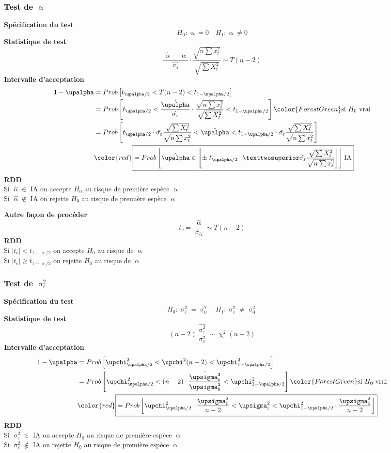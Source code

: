 \documentclass{article}
\newcommand{\halpha}{\hat{\upalpha}}
\newcommand{\sig}{\upsigma_\varepsilon^2}
\newcommand{\studn}{t_{\upalpha / 2}}
\newcommand{\studp}{t_{1 - \upalpha / 2}}
\newcommand{\chin}{\upchi_{\upalpha / 2}^2}
\newcommand{\chip}{\upchi_{1 - \upalpha / 2}^2}
\begin{document}
\subsubsection{Test de $\upalpha$}
	\textbf{Spécification du test} \\
	\[H_0 : \upalpha = 0 \quad H_1 : \upalpha \neq 0\]
	\textbf{Statistique de test}
	\[ \frac{\halpha - \upalpha}{\hat{\sigma_\varepsilon}} \cdot \frac{\sqrt{n \sum x_t^2}}{\sqrt{\sum X_t^2}} \sim T(n-2) \]
	\textbf{Intervalle d'acceptation}
	\begin{align*}
		1- \upalpha &= Prob\left[\studn < T(n-2) <\studp\right] \\
		&= Prob\left[\studn<  \frac{\halpha}{\hat{\sigma_\varepsilon}} \cdot \frac{\sqrt{n \sum x_t^2}}{\sqrt{\sum X_t^2}}<\studp\right] {\color{ForestGreen}\textrm{si }H_0 \textrm{ vrai}}\\
		&= Prob\left[\studn \cdot \hat{\sigma_\varepsilon} \frac{\sqrt{\sum X_t^2}}{\sqrt{n \sum x_t^2}}   < \halpha <\studp \cdot \hat{\sigma_\varepsilon} \frac{\sqrt{\sum X_t^2}}{\sqrt{n \sum x_t^2}} \right]\\
		&{\color{red} \boxed{= Prob\left[\halpha \in \left[\pm \; \studn \cdot² \hat{\sigma_\varepsilon} \frac{\sqrt{\sum X_t^2}}{\sqrt{n \sum x_t^2}}  \right]\right] \textrm{IA} }}
	\end{align*}
	\textbf{RDD } \\
	Si $\halpha \in $ IA on accepte $H_0$ au risque de première espèce $\upalpha$ \\
	Si $\halpha \notin $ IA on rejette $H_0$ au risque de première espèce $\upalpha$ 

	\textbf{Autre façon de procéder} 
\[t_c = \frac{\halpha}{\hat{\sigma}_{\hat{\upalpha}}} \sim T(n-2)\]
	\textbf{RDD}\\
	Si $|t_c| < \studp $ on accepte $H_0$ au risque de $\upalpha$ \\
	Si $|t_c| \geq \studp $ on rejette $H_0$ au risque de $\upalpha$ \\
\subsubsection{Test de $\sig$}
\textbf{Spécification du test} 
\[H_0 : \sig = \upsigma_0^2 \quad H_1 : \sig \neq \upsigma_0^2\]
\textbf{Statistique de test} 
\[(n-2) \frac{\hat{\sig}}{\sig} \sim \upchi^2 (n-2)\]
\textbf{Intervalle d'acceptation}
\begin{align*}
	1 - \upalpha &= Prob\left[\chin<\upchi^2 (n-2)<\chip\right] \\
	&= Prob\left[\chin < (n-2) \cdot \frac{\hat{\sig}}{\upsigma_0^2} < \chip \right] {\color{ForestGreen}\textrm{si }H_0 \textrm{ vrai}}\\
	&{\color{red}\boxed{ = Prob\left[\chin \cdot \frac{\upsigma_ 0^2}{n-2} < \sig < \chip \cdot \frac{\upsigma_ 0^2}{n-2} \right]}}
\end{align*}
\textbf{RDD} \\
	Si $\sig \in $ IA on accepte $H_0$ au risque de première espèce $\upalpha$ \\
	Si $\sig \notin $ IA on rejette $H_0$ au risque de première espèce $\upalpha$
\end{document}
